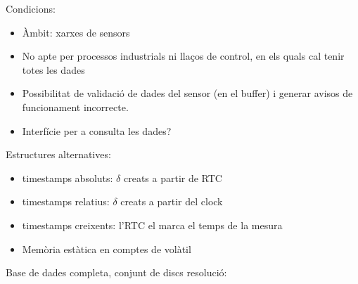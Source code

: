 Condicions:
\begin{itemize}
\item Àmbit: xarxes de sensors
\item No apte per processos industrials ni llaços de control, en els
  quals cal tenir totes les dades
\item Possibilitat de validació de dades del sensor (en el buffer) i
  generar avisos de funcionament incorrecte.
\item Interfície per a consulta les dades?
\end{itemize}





Estructures alternatives:
\begin{itemize}
\item timestamps absoluts: $\delta$ creats a partir de RTC
\item timestamps relatius: $\delta$ creats a partir del clock
\item timestamps creixents: l'RTC el marca el temps de la mesura
\item Memòria estàtica en comptes de volàtil
\end{itemize}





Base de dades completa, conjunt de discs resolució:
\usetikzlibrary{shapes,arrows,positioning}

